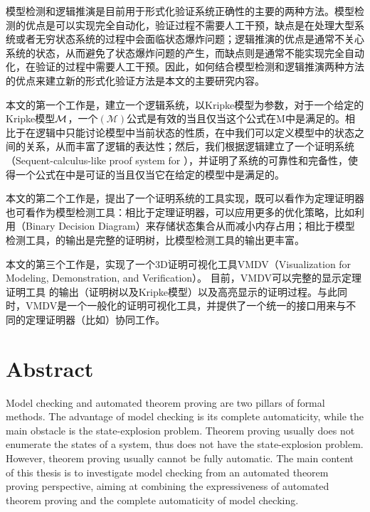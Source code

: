 模型检测和逻辑推演是目前用于形式化验证系统正确性的主要的两种方法。模型检测的优点是可以实现完全自动化，验证过程不需要人工干预，缺点是在处理大型系统或者无穷状态系统的过程中会面临状态爆炸问题；逻辑推演的优点是通常不关心系统的状态，从而避免了状态爆炸问题的产生，而缺点则是通常不能实现完全自动化，在验证的过程中需要人工干预。因此，如何结合模型检测和逻辑推演两种方法的优点来建立新的形式化验证方法是本文的主要研究内容。

本文的第一个工作是，建立一个逻辑系统\CTLP{}，\CTLP{}以Kripke模型为参数，对于一个给定的Kripke模型$\cal M$，一个\CTLP$(\mathcal{M})$公式是有效的当且仅当这个公式在M中是满足的。相比于在\CTL{}逻辑中只能讨论模型中当前状态的性质，在\CTLP{}中我们可以定义模型中的状态之间的关系，从而丰富了\CTL{}逻辑的表达性；然后，我们根据逻辑\CTLP{}建立了一个证明系统\SCTL{}（Sequent-calculus-like proof system for \CTLP{}），并证明了\SCTL{}系统的可靠性和完备性，使得一个公式在\SCTL{}中是可证的当且仅当它在给定的模型中是满足的。

本文的第二个工作是，提出了一个\SCTL{}证明系统的工具实现\sctlprov{}，\sctlprov{}既可以看作为定理证明器也可看作为模型检测工具：相比于定理证明器，\sctlprov{}可以应用更多的优化策略，比如利用\BDD{}（Binary Decision Diagram）来存储状态集合从而减小内存占用；相比于模型检测工具，\sctlprov{}的输出是完整的证明树，比模型检测工具的输出更丰富。

本文的第三个工作是，实现了一个3D证明可视化工具\textsf{VMDV}（Visualization for Modeling, Demonstration, and Verification）。 目前，\textsf{VMDV}可以完整的显示定理证明工具 \sctlprov{} 的输出（证明树以及Kripke模型）以及高亮显示\sctlprov{}的证明过程。与此同时，\textsf{VMDV}是一个一般化的证明可视化工具，并提供了一个统一的接口用来与不同的定理证明器（比如）协同工作。


\chapter*{Abstract}%

Model checking and automated theorem proving are two pillars of formal methods. The advantage of model checking is its complete automaticity, while the main obstacle is the state-explosion problem. Theorem proving usually does not enumerate the states of a system, thus does not have the state-explosion problem. However, theorem proving usually cannot be fully automatic. The main content of this thesis is to investigate model checking from an automated theorem proving perspective, aiming at combining the expressiveness of automated theorem proving and the complete automaticity of model checking.

